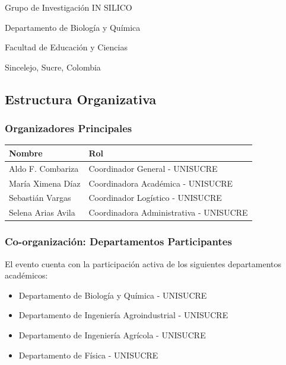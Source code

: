 \documentclass[12pt,a4paper]{article}
\begin{document}
\begin{tcolorbox}[cajainfo, title=Universidad de Sucre]
Grupo de Investigación IN SILICO

Departamento de Biología y Química

Facultad de Educación y Ciencias

Sincelejo, Sucre, Colombia
\end{tcolorbox}

\subsection{Estructura Organizativa}

\subsubsection{Organizadores Principales}

\begin{table}[H]
\centering
\begin{tabular}{|p{5cm}|p{10cm}|}
\hline
\rowcolor{verdeclaro}
\textbf{Nombre} & \textbf{Rol} \\
\hline
Aldo F. Combariza & Coordinador General - UNISUCRE \\
\hline
María Ximena Díaz & Coordinadora Académica - UNISUCRE \\
\hline
Sebastián Vargas & Coordinador Logístico - UNISUCRE \\
\hline
Selena Arias Avila & Coordinadora Administrativa - UNISUCRE \\
\hline
\end{tabular}
\end{table}

\subsubsection{Co-organización: Departamentos Participantes}

El evento cuenta con la participación activa de los siguientes departamentos académicos:

\begin{itemize}[label={\textcolor{verdelimpio}{\checkmark}}]
  \item Departamento de Biología y Química - UNISUCRE
  \item Departamento de Ingeniería Agroindustrial - UNISUCRE
  \item Departamento de Ingeniería Agrícola - UNISUCRE
  \item Departamento de Física - UNISUCRE
\end{itemize}
\end{document}
